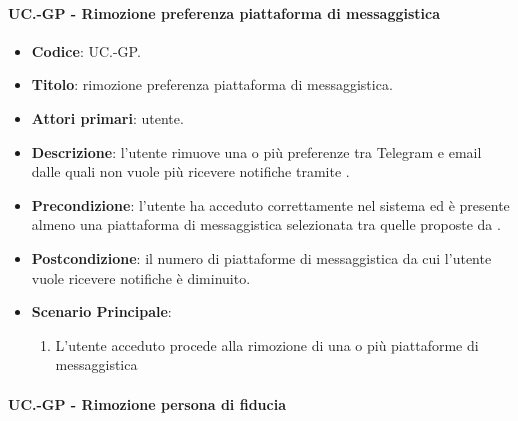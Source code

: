 	\paragraph{UC\theuccount.\thesubuccount-GP - Rimozione preferenza piattaforma di messaggistica}
	
	\begin{itemize}
		\item \textbf{Codice}: UC\theuccount.\thesubuccount-GP.
		\item \textbf{Titolo}: rimozione preferenza piattaforma di messaggistica.
		\item \textbf{Attori primari}: utente.
		\item \textbf{Descrizione}: l’utente rimuove una o più preferenze tra Telegram e email dalle	quali non vuole più ricevere notifiche tramite \progetto.
		\item \textbf{Precondizione}: l’utente ha acceduto correttamente nel sistema ed è presente almeno una piattaforma di messaggistica selezionata tra quelle proposte da \progetto.
		\item \textbf{Postcondizione}: il numero di piattaforme di messaggistica da cui l’utente vuole ricevere notifiche è diminuito.
		\item \textbf{Scenario Principale}:
		\begin{enumerate}
			\item L'utente acceduto procede alla rimozione di una o più piattaforme di messaggistica
		\end{enumerate}
	\end{itemize}
	
	\paragraph{UC\theuccount.\thesubuccount-GP - Rimozione persona di fiducia}
	
